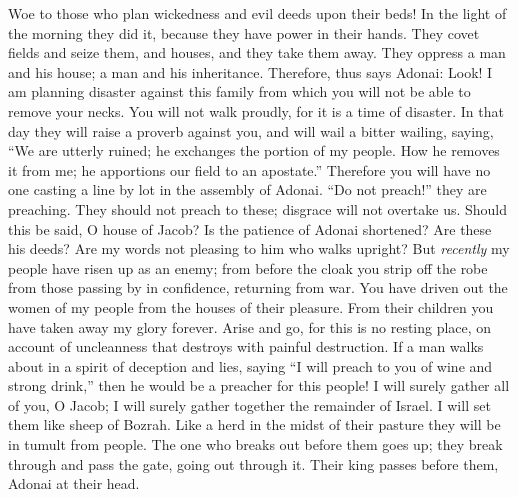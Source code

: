 \begin{biblechapter} %
 Woe to those who plan wickedness 
and evil deeds upon their beds! 
In the light of the morning they did it, 
because they have power in their hands.
\verse They covet fields and seize them, 
and houses, and they take them away. 
They oppress a man and his house; 
a man and his inheritance.
\verse Therefore, thus says Adonai: Look! I am planning disaster against this family from which you will not be able to remove your necks. You will not walk proudly, for it is a time of disaster.
\verse In that day they will raise a proverb against you, 
and will wail a bitter wailing, saying, 
“We are utterly ruined; 
he exchanges the portion of my people. 
How he removes it from me; 
he apportions our field to an apostate.”
\verse Therefore you will have no one casting a line by lot 
in the assembly of Adonai.
\verse “Do not preach!” they are preaching. 
They should not preach to these; 
disgrace will not overtake us.
\verse Should this be said, O house of Jacob? 
Is the patience of Adonai shortened? 
Are these his deeds? 
Are my words not pleasing 
to him who walks upright?
\verse But \textit{recently} my people have risen up as an enemy; 
from before the cloak you strip off the robe 
from those passing by in confidence, 
returning from war.
\verse You have driven out the women of my people 
from the houses of their pleasure. 
From their children you have taken away 
my glory forever.
\verse Arise and go, 
for this is no resting place, 
on account of uncleanness that destroys 
with painful destruction.
\verse If a man walks about in a spirit of deception and lies, 
saying “I will preach to you of wine and strong drink,” 
then he would be a preacher for this people!
\verse I will surely gather all of you, O Jacob; 
I will surely gather together the remainder of Israel. 
I will set them like sheep of Bozrah. 
Like a herd in the midst of their pasture 
they will be in tumult from people.
\verse The one who breaks out before them goes up; 
they break through and pass the gate, 
going out through it. 
Their king passes before them, 
Adonai at their head.
\end{biblechapter}

